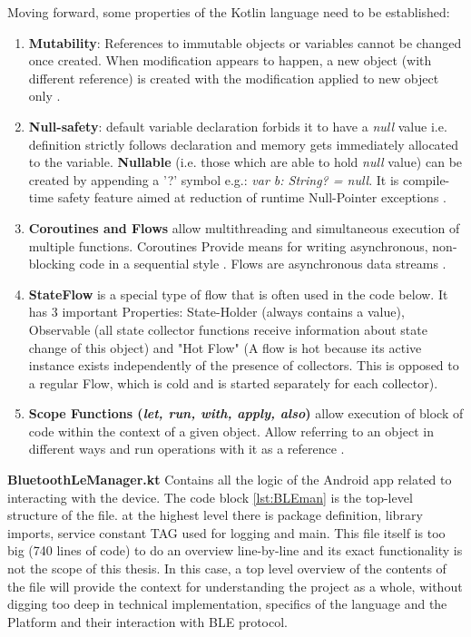 Moving forward, some properties of the Kotlin language need to be established:
\begin{enumerate}
	\item \textbf{Mutability}: References to immutable objects or variables cannot be changed once created. When modification appears to happen, a new object (with different reference) is created with the modification applied to new object only \cite{kotlin_variables} \cite{kotlin_collections}.
	\item \textbf{Null-safety}: default variable declaration forbids it to have a \textit{null} value i.e. definition strictly follows declaration and memory gets immediately allocated to the variable. \textbf{Nullable} (i.e. those which are able to hold \textit{null} value) can be created by appending a '?' symbol e.g.: \textit{var b: String? = null}. It is  compile-time safety feature aimed at reduction of runtime Null-Pointer exceptions \cite{kotlin_null_safety}.
	\item \textbf{Coroutines and Flows} allow multithreading and simultaneous execution of multiple functions. Coroutines Provide means for writing asynchronous, non-blocking code in a sequential style \cite{kotlin_coroutines}. Flows are asynchronous data streams \cite{kotlin_flow}. 
	\item \textbf{StateFlow} is a special type of flow that is often used in the code below. It has 3 important Properties: State-Holder (always contains a value), Observable (all state collector functions receive information about state change of this object) and "Hot Flow" (A flow is hot because its active instance exists independently of the presence of collectors. This is opposed to a regular Flow, which is cold and is started separately for each collector)\cite{jetbrains_stateflow}.
	\item \textbf{Scope Functions (\textit{let, run, with, apply, also})} allow execution of block of code within the context of a given object. Allow referring to an object in different ways and run operations with it as a reference \cite{kotlin_scope_functions}.
\end{enumerate}

\textbf{BluetoothLeManager.kt} Contains all the logic of the Android app related to interacting with the device. The code block \ref{lst:BLEman} is the top-level structure of the file. at the highest level there is package definition, library imports, service constant TAG used for logging and main. This file itself is too big (740 lines of code) to do an overview line-by-line and its exact functionality is not the scope of this thesis. In this case, a top level overview of the contents of the file will provide the context for understanding the project as a whole, without digging too deep in technical implementation, specifics of the language and the Platform and their interaction with \ac{BLE} protocol.

